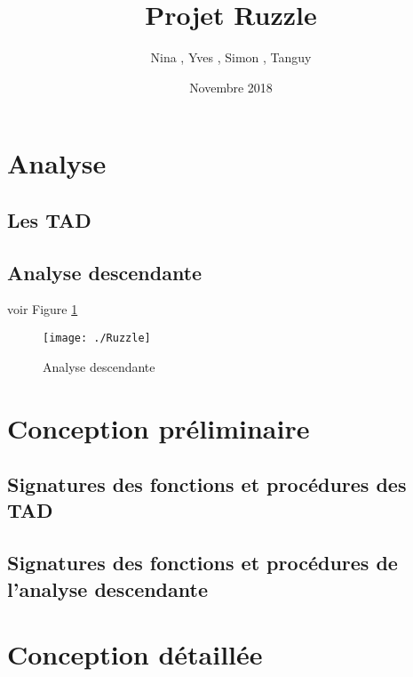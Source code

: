 \documentclass[a4paper]{article}
\title{Projet Ruzzle}
\author{Nina \noun{Lardiere}, Yves \noun{Le Guennec}, Simon \noun{Lebeaud}, Tanguy \noun{Leclerc}}
\date{Novembre 2018}
\begin{document}
	\maketitle
	\section{Analyse}
		\subsection{Les TAD}
			

		\subsection{Analyse descendante}
			voir Figure \ref{fig:AD}
			\begin{figure}
				\centering \texttt{[image: ./Ruzzle]} %
				\caption{\label{fig:AD}Analyse descendante}
			\end{figure}

 \section{Conception préliminaire}
		\subsection{Signatures des fonctions et procédures des TAD}
			
			
			
			

		\subsection{Signatures des fonctions et procédures de l'analyse descendante}

\section{Conception détaillée}
	
	
\end{document}
